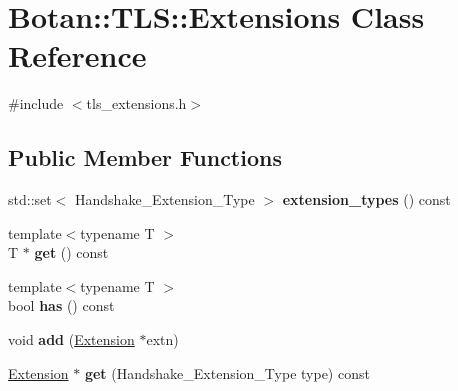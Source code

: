 \hypertarget{class_botan_1_1_t_l_s_1_1_extensions}{}\section{Botan\+:\+:T\+LS\+:\+:Extensions Class Reference}
\label{class_botan_1_1_t_l_s_1_1_extensions}


{\ttfamily \#include $<$tls\+\_\+extensions.\+h$>$}

\subsection*{Public Member Functions}
\begin{DoxyCompactItemize}
\item 
\mbox{\label{class_botan_1_1_t_l_s_1_1_extensions_a547825edf6d0ed909025cd609e7c75d6}} 
std\+::set$<$ Handshake\+\_\+\+Extension\+\_\+\+Type $>$ {\bfseries extension\+\_\+types} () const
\item 
\mbox{\label{class_botan_1_1_t_l_s_1_1_extensions_a236517e345c0d96e13ee70abcb5fe655}} 
{\footnotesize template$<$typename T $>$ }\\T $\ast$ {\bfseries get} () const
\item 
\mbox{\label{class_botan_1_1_t_l_s_1_1_extensions_afe9d5fe73cb473313f758877c3f131e3}} 
{\footnotesize template$<$typename T $>$ }\\bool {\bfseries has} () const
\item 
\mbox{\label{class_botan_1_1_t_l_s_1_1_extensions_a7311e3e553dff2b904f3f000433979d5}} 
void {\bfseries add} (\mbox{\hyperlink{class_botan_1_1_t_l_s_1_1_extension}{Extension}} $\ast$extn)
\item 
\mbox{\label{class_botan_1_1_t_l_s_1_1_extensions_a072605270a7281e890afba9043ac038e}} 
\mbox{\hyperlink{class_botan_1_1_t_l_s_1_1_extension}{Extension}} $\ast$ {\bfseries get} (Handshake\+\_\+\+Extension\+\_\+\+Type type) const
\item 
\mbox{\label{class_botan_1_1_t_l_s_1_1_extensions_adf45e5e253c9d39338022fd9da0e6db8}} 

\end{DoxyCompactItemize}
